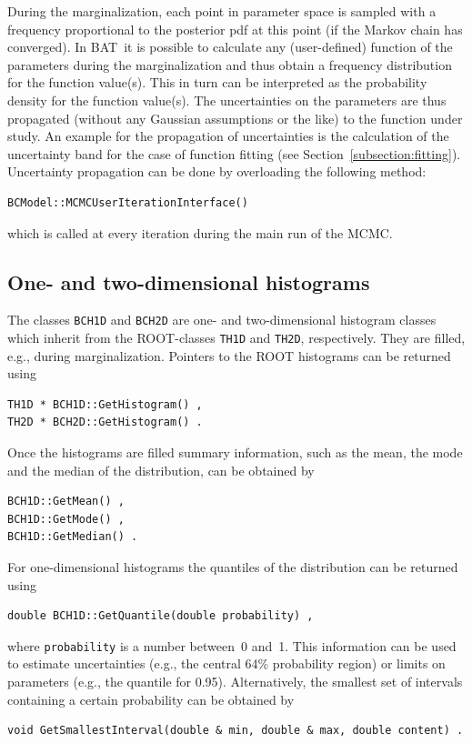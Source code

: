 \documentclass[11pt, a4paper]{article}
\newcommand{\BAT}{{\sc BAT}}
\begin{document}
During the marginalization, each point in parameter space is sampled
with a frequency proportional to the posterior pdf at this point (if
the Markov chain has converged). In \BAT\ it is possible to calculate
any (user-defined) function of the parameters during the
marginalization and thus obtain a frequency distribution for the
function value(s). This in turn can be interpreted as the probability
density for the function value(s). The uncertainties on the parameters
are thus propagated (without any Gaussian assumptions or the like) to
the function under study. An example for the propagation of
uncertainties is the calculation of the uncertainty band for the case
of function fitting (see Section~\ref{subsection:fitting}).
Uncertainty propagation can be done by overloading the following
method:
%
\begin{verbatim}
BCModel::MCMCUserIterationInterface() 
\end{verbatim}
%
which is called at every iteration during the main run of the MCMC.


\subsection{One- and two-dimensional histograms} 

The classes \verb|BCH1D| and \verb|BCH2D| are one- and two-dimensional
histogram classes which inherit from the ROOT-classes \verb|TH1D| and
\verb|TH2D|, respectively. They are filled, e.g., during
marginalization. Pointers to the ROOT histograms can be returned using
%
\begin{verbatim}
TH1D * BCH1D::GetHistogram() ,
TH2D * BCH2D::GetHistogram() .
\end{verbatim}
%
Once the histograms are filled summary information, such as the mean,
the mode and the median of the distribution, can be obtained by
%
\begin{verbatim}
BCH1D::GetMean() , 
BCH1D::GetMode() , 
BCH1D::GetMedian() . 
\end{verbatim} 
%
For one-dimensional histograms the quantiles of the distribution can
be returned using
%
\begin{verbatim}
double BCH1D::GetQuantile(double probability) , 
\end{verbatim}
%
where \verb|probability| is a number between~0 and~1. This information
can be used to estimate uncertainties (e.g., the central 64\%
probability region) or limits on parameters (e.g., the quantile for
0.95). Alternatively, the smallest set of intervals containing a
certain probability can be obtained by 
%
\begin{verbatim}
void GetSmallestInterval(double & min, double & max, double content) . 
\end{verbatim}
\end{document}
